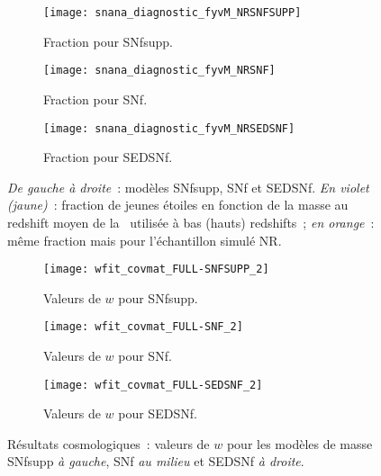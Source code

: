\documentclass[../main/main.tex]{subfiles}
\begin{document}
\begin{landscape}
\begin{figure}[p]
    \centerfloat
    \vspace{-0.5cm}
    \begin{subfigure}[]{.30\linewidth}
        \centering
        \texttt{[image: snana\_diagnostic\_fyvM\_NRSNFSUPP]}
        \caption[Fraction pour SEDSNf]{Fraction pour SNfsupp.}
        \label{fig:fyvMsnfsupp}
    \end{subfigure}
    \centering
    \begin{subfigure}[]{.30\linewidth}
        \centering
        \texttt{[image: snana\_diagnostic\_fyvM\_NRSNF]}
        \caption[Fraction pour SEDSNf]{Fraction pour SNf.}
        \label{fig:fyvMsnf}
    \end{subfigure}
    \begin{subfigure}[]{.30\linewidth}
        \centering
        \texttt{[image: snana\_diagnostic\_fyvM\_NRSEDSNF]}
        \caption[Fraction pour SEDSNf]{Fraction pour SEDSNf.}
        \label{fig:fyvMsed}
    \end{subfigure}
    \caption[Évolution de la fraction de jeunes étoiles en fonction de la masse
    pour les différents modèles de masse]{\textit{De gauche à droite}~: modèles
        SNfsupp, SNf et SEDSNf. \textit{En violet (jaune)}~: fraction de jeunes
        étoiles en fonction de la masse au redshift moyen de la \hostlib\
        utilisée à bas (hauts) redshifts~; \textit{en orange}~: même fraction
    mais pour l'échantillon simulé NR.}
    \label{fig:fyvM}
\end{figure}

\begin{figure}[h!]
    \centerfloat
    \begin{subfigure}[]{.30\linewidth}
        \centering
        \texttt{[image: wfit\_covmat\_FULL-SNFSUPP\_2]}
        \caption[Valeurs de $w$ avec le modèle de masse SNf]{Valeurs de
        $w$ pour SNfsupp.}
        \label{fig:wsnfsupp}
    \end{subfigure}
    \begin{subfigure}[]{.30\linewidth}
        \centering
        \texttt{[image: wfit\_covmat\_FULL-SNF\_2]}
        \caption[Valeurs de $w$ avec le modèle de masse SNf]{Valeurs de
        $w$ pour SNf.}
        \label{fig:wsnf}
    \end{subfigure}
    \begin{subfigure}[]{.30\linewidth}
        \centering
        \texttt{[image: wfit\_covmat\_FULL-SEDSNF\_2]}
        \caption[Valeurs de $w$ avec le modèle de masse SEDSNf]{Valeurs de
        $w$ pour SEDSNf.}
        \label{fig:wsed}
    \end{subfigure}
    \caption[Résultats cosmologiques~: $w$ selon le modèle de
    masse]{Résultats cosmologiques~: valeurs de $w$ pour les modèles de
        masse SNfsupp \textit{à gauche}, SNf \textit{au milieu} et SEDSNf
    \textit{à droite}.}
    \label{fig:wdiff}
\end{figure}
\end{landscape}
\end{document}
